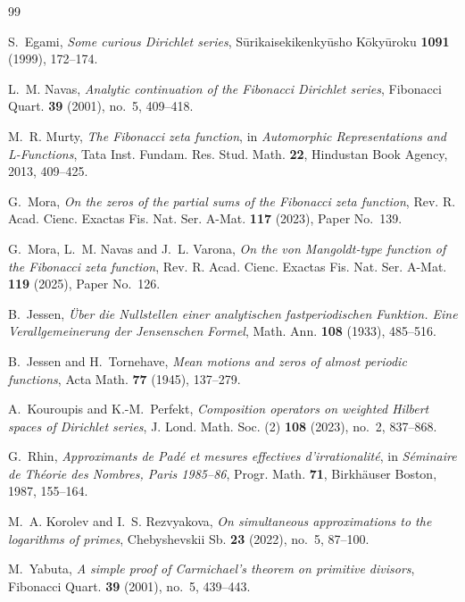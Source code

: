 \documentclass[11pt]{article}
\theoremstyle{remark}
\begin{document}
\begin{thebibliography}{99}

S.~Egami,
\emph{Some curious Dirichlet series},
S\=urikaisekikenky\=usho K\=oky\=uroku \textbf{1091} (1999), 172--174.

L.~M. Navas,
\emph{Analytic continuation of the Fibonacci Dirichlet series},
Fibonacci Quart. \textbf{39} (2001), no.~5, 409--418.

M.~R. Murty,
\emph{The Fibonacci zeta function},
in \emph{Automorphic Representations and L-Functions},
Tata Inst. Fundam. Res. Stud. Math. \textbf{22}, Hindustan Book Agency, 2013, 409--425.

G.~Mora,
\emph{On the zeros of the partial sums of the Fibonacci zeta function},
Rev. R. Acad. Cienc. Exactas Fis. Nat. Ser. A-Mat. \textbf{117} (2023), Paper No.~139.

G.~Mora, L.~M. Navas and J.~L. Varona,
\emph{On the von Mangoldt-type function of the Fibonacci zeta function},
Rev. R. Acad. Cienc. Exactas Fis. Nat. Ser. A-Mat. \textbf{119} (2025), Paper No.~126.

B.~Jessen,
\emph{\"Uber die Nullstellen einer analytischen fastperiodischen Funktion. Eine Verallgemeinerung der Jensenschen Formel},
Math. Ann. \textbf{108} (1933), 485--516.

B.~Jessen and H.~Tornehave,
\emph{Mean motions and zeros of almost periodic functions},
Acta Math. \textbf{77} (1945), 137--279.

A.~Kouroupis and K.-M.~Perfekt,
\emph{Composition operators on weighted Hilbert spaces of Dirichlet series},
J. Lond. Math. Soc. (2) \textbf{108} (2023), no.~2, 837--868.

G.~Rhin,
\emph{Approximants de Pad\'e et mesures effectives d'irrationalit\'e},
in \emph{S\'eminaire de Th\'eorie des Nombres, Paris 1985--86},
Progr. Math. \textbf{71}, Birkh\"auser Boston, 1987, 155--164.

M.~A. Korolev and I.~S. Rezvyakova,
\emph{On simultaneous approximations to the logarithms of primes},
Chebyshevskii Sb. \textbf{23} (2022), no.~5, 87--100.

M.~Yabuta,
\emph{A simple proof of Carmichael's theorem on primitive divisors},
Fibonacci Quart. \textbf{39} (2001), no.~5, 439--443.


\end{thebibliography}
\end{document}
